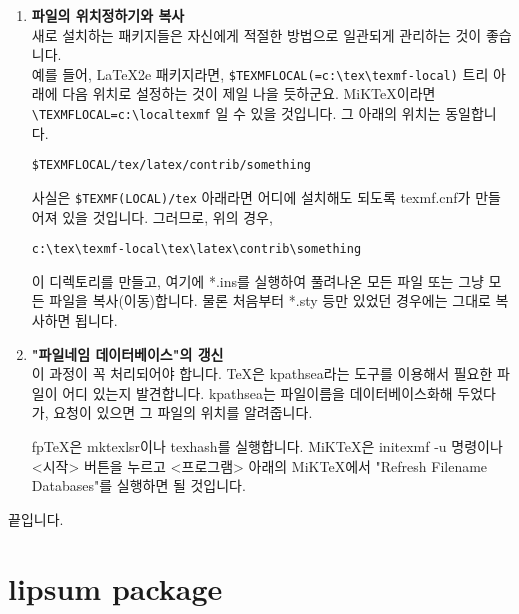 \begin{enumerate}
\begin{description}
					   \textbf{latex something.dtx} \\
					   \textbf{latex something.dtx} (두 번 실행하는 것이 좋습니다.) \\
					   이 결과 something.dvi가 얻어집니다.
			\end{description}

	\clearpage
	\item  	\textbf{파일의 위치정하기와 복사} \\
			새로 설치하는 패키지들은 자신에게 적절한 방법으로 일관되게 관리하는 것이 좋습니다. \\
			예를 들어, LaTeX2e 패키지라면, \verb|$TEXMFLOCAL(=c:\tex\texmf-local)| 트리 아래에 다음 
			위치로 설정하는 것이 제일 나을 듯하군요.
			MiKTeX이라면 \verb|\TEXMFLOCAL=c:\localtexmf| 일 수 있을 것입니다. 그 아래의 위치는 동일합니다.

  
			\verb|$TEXMFLOCAL/tex/latex/contrib/something|

			사실은 \verb|$TEXMF(LOCAL)/tex| 아래라면 어디에
			설치해도 되도록 texmf.cnf가 만들어져 있을 것입니다. 그러므로, 위의 경우,

			  \verb|c:\tex\texmf-local\tex\latex\contrib\something|

			이 디렉토리를 만들고, 여기에 *.ins를 실행하여 풀려나온 모든 파일 또는 그냥 모든 파일을 복사(이동)합니다.
			물론 처음부터 *.sty 등만 있었던 경우에는 그대로 복사하면 됩니다.
	
	\item  	\textbf{"파일네임 데이터베이스"의 갱신 }\\
			이 과정이 꼭 처리되어야 합니다. 
			TeX은 kpathsea라는 도구를 이용해서 필요한 파일이 어디 있는지 발견합니다.
			kpathsea는 파일이름을 데이터베이스화해 두었다가, 요청이 있으면 그 파일의 위치를 알려줍니다.
		
			fpTeX은 mktexlsr이나 texhash를 실행합니다.
			MiKTeX은 initexmf -u 명령이나 <시작> 버튼을 누르고 <프로그램> 아래의 MiKTeX에서
			"Refresh Filename Databases"를 실행하면 될 것입니다.
	\end{enumerate}

	끝입니다.
		
		







	\clearpage
	\section{lipsum package}




